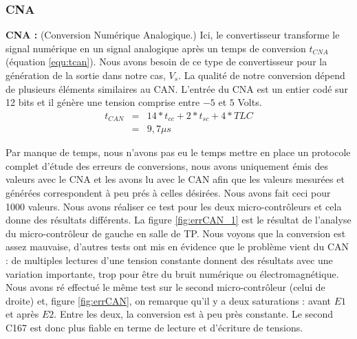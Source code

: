 \subsubsection{CNA}
\hspace{3mm} \textbf{CNA :} (Conversion Numérique Analogique.) Ici, le convertisseur transforme le signal numérique en un signal analogique après un temps de conversion $t_{CNA}$ (équation \ref{equ:tcan}). Nous avons besoin de ce type de convertisseur pour la génération de la sortie dans notre cas, $V_{s}$. La qualité de notre conversion dépend de plusieurs éléments similaires au CAN. L'entrée du CNA est un entier codé sur 12 bits et il génère une tension comprise entre $-5$ et $5$ Volts. 
\begin{eqnarray}
\label{equ:tcan}
t_{CAN} &=& 14*t_{cc} + 2*t_{sc} + 4*TLC \\
&=&  9,7 \mu s%
\end{eqnarray}

Par manque de temps, nous n'avons pas eu le temps mettre en place un protocole complet d'étude des erreurs de conversions, nous avons uniquement émis des valeurs avec le CNA et les avons lu avec le CAN afin que les valeurs mesurées et générées correspondent à peu prés à celles désirées. Nous avons fait ceci pour 1000 valeurs. Nous avons réaliser ce test pour les deux micro-contrôleurs et cela donne des résultats différents. La figure \ref{fig:errCAN_1} est le résultat de l'analyse du micro-contrôleur de gauche en salle de TP. Nous voyons que la conversion est assez mauvaise, d'autres tests ont mis en évidence que le problème vient du CAN : de multiples lectures d'une tension constante donnent des résultats avec une variation importante, trop pour être du bruit numérique ou électromagnétique. Nous avons ré effectué le même test sur le second micro-contrôleur (celui de droite) et, figure \ref{fig:errCAN}, on remarque qu'il y a deux saturations : avant $E1$ et après $E2$. Entre les deux, la conversion est à peu près constante. Le second C167 est donc plus fiable en terme de lecture et d'écriture de tensions.



